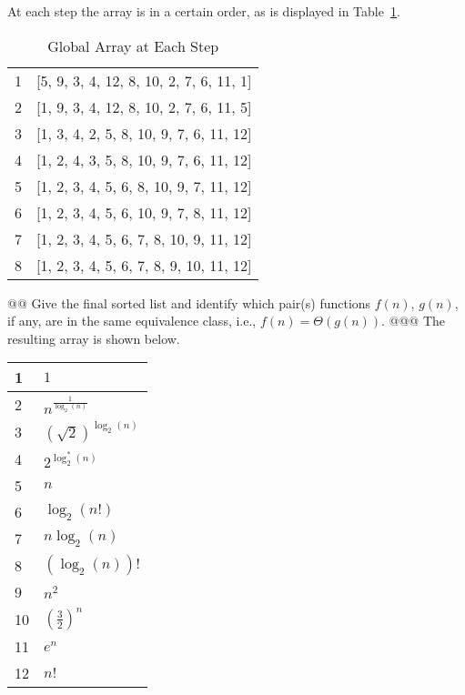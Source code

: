 \documentclass[10pt]{article}
\begin{document}
\begin{easylist}[enumerate]
        At each step the array is in a certain order, as is displayed in Table~\ref{table:order}.

        \begin{table}[ht]
            \centering
            \begin{tabular}{| l | l |}
                \hline
                1 & [5, 9, 3, 4, 12, 8, 10, 2, 7, 6, 11, 1]\\
                2 & [1, 9, 3, 4, 12, 8, 10, 2, 7, 6, 11, 5]\\
                3 & [1, 3, 4, 2, 5, 8, 10, 9, 7, 6, 11, 12]\\
                4 & [1, 2, 4, 3, 5, 8, 10, 9, 7, 6, 11, 12]\\
                5 & [1, 2, 3, 4, 5, 6, 8, 10, 9, 7, 11, 12]\\
                6 & [1, 2, 3, 4, 5, 6, 10, 9, 7, 8, 11, 12]\\
                7 & [1, 2, 3, 4, 5, 6, 7, 8, 10, 9, 11, 12]\\
                8 & [1, 2, 3, 4, 5, 6, 7, 8, 9, 10, 11, 12]\\
                \hline
            \end{tabular}
            \caption{Global Array at Each Step}
            \label{table:order}
        \end{table}

    \newpage
    @@ Give the final sorted list and identify which pair(s) functions $f(n)$, $g(n)$, if any, are in the same equivalence class, i.e., $f(n) = \Theta(g(n))$.
    @@@ The resulting array is shown below.

    \begin{center}
        \begin{tabular}{|l|l|}
            \hline
            1 & $1$\\
            \hline
            2 & $n^{\frac{1}{\log_2(n)} }$\\
            \hline
            3 & ${\left( \sqrt{2} \right)}^{\log_2(n)}$\\
            \hline
            4 & $2^{\log^*_2(n)}$\\
            \hline
            5 & $n$\\
            \hline
            6 & $\log_2(n!)$\\
            \hline
            7 & $n \log_2(n)$\\
            \hline
            8 & $(\log_2(n))!$\\
            \hline
            9 & $n^2$\\
            \hline
            10 & ${ \left( \frac{3}{2} \right) }^n$\\
            \hline
            11 & $e^n$\\
            \hline
            12 & $n!$\\
            \hline
        \end{tabular}
    \end{center}


\end{easylist}
\end{document}
